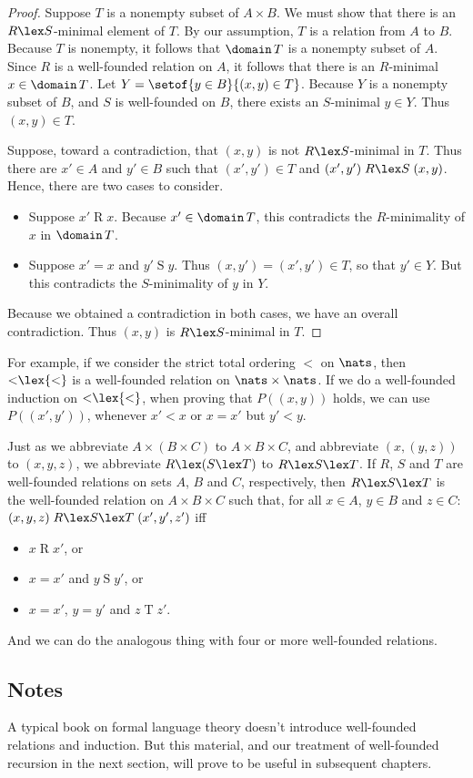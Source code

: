 \begin{proof}
Suppose $T$ is a nonempty subset of $A\times B$.  We must show that
there is an $R\lex S$-minimal element of $T$.  By our assumption,
$T$ is a relation from $A$ to $B$.  Because $T$ is nonempty, it
follows that $\domain\,T$ is a nonempty subset of $A$.  Since
$R$ is a well-founded relation on $A$, it follows that there
is an $R$-minimal $x\in\domain\,T$.  Let $Y=\setof{y\in B}{(x,y)\in T}$.
Because $Y$ is a nonempty subset of $B$, and
$S$ is well-founded on $B$, there exists an $S$-minimal $y\in Y$.
Thus $(x,y)\in T$.

Suppose, toward a contradiction, that
$(x,y)$ is not $R\lex S$-minimal in $T$.  Thus there are
$x'\in A$ and $y'\in B$ such that $(x',y')\in T$ and
$(x',y')\mathrel{R\lex S}(x,y)$.  Hence, there are two cases to
consider.
\begin{itemize}
\item Suppose $x'\mathrel{R}x$.  Because $x'\in\domain\,T$, this
contradicts the $R$-minimality of $x$ in $\domain\,T$.

\item Suppose $x'=x$ and $y'\mathrel{S}y$.  Thus $(x,y')=(x',y')\in T$,
so that $y'\in Y$.  But this contradicts the $S$-minimality of $y$
in $Y$.
\end{itemize}
Because we obtained a contradiction in both cases, we have
an overall contradiction.  Thus $(x,y)$ is $R\lex S$-minimal in $T$.
\end{proof}

For example, if we consider the strict total ordering $<$ on $\nats$,
then ${<}\lex{<}$ is a well-founded relation on $\nats\times\nats$.
If we do a well-founded induction on ${<}\lex{<}$, when proving that
$P((x,y))$ holds, we can use $P((x',y'))$, whenever $x'<x$ or $x=x'$
but $y'<y$.

Just as we abbreviate $A\times(B\times C)$ to $A\times B\times C$,
and abbreviate $(x,(y,z))$ to $(x,y,z)$, we abbreviate $R\lex(S\lex T)$
to $R\lex S\lex T$.
If $R$, $S$ and $T$ are well-founded relations on sets $A$, $B$ and
$C$, respectively, then $R\lex S\lex T$ is the well-founded relation
on $A\times B\times C$ such that, for all $x\in A$, $y\in B$ and $z\in
C$: $(x,y,z)\mathrel{R\lex S\lex T}(x',y',z')$ iff
\begin{itemize}
\item $x\mathrel{R}x'$, or
\item $x=x'$ and $y\mathrel{S}y'$, or
\item $x=x'$, $y=y'$ and $z\mathrel{T}z'$.
\end{itemize}
And we can do the analogous thing with four or more well-founded
relations.
%

\subsection{Notes}

A typical book on formal language theory doesn't introduce well-founded
relations and induction.  But this material, and our treatment of
well-founded recursion in the next section, will prove to be useful
in subsequent chapters.

